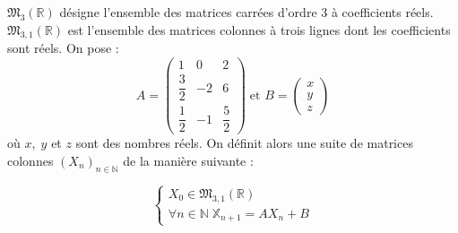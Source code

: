 \documentclass[a4paper, 11pt,reqno]{article}
\begin{document}
$\mathfrak{M}_{3}\left( \mathbb{R}\right) $ désigne l'ensemble des matrices
carrées d'ordre 3 à coefficients réels.\newline
$\mathfrak{M}_{3,1}\left( \mathbb{R}\right) $ est l'ensemble des matrices
colonnes à trois lignes dont les coefficients sont réels.\newline
On pose : 
\begin{equation*}
A=\left( 
\begin{array}{lll}
1 & 0 & 2 \\ 
\dfrac{3}{2} & -2 & 6 \\ 
\dfrac{1}{2} & -1 & \dfrac{5}{2}%
\end{array}%
\right) \;\text{et }B=\left( 
\begin{array}{c}
x \\ 
y \\ 
z%
\end{array}%
\right) 
\end{equation*}%
où $x,\;y$ et $z$ sont des nombres réels.\newline
On définit alors une suite de matrices colonnes $\left( X_{n}\right) _{n\in 
\mathbb{N}}$ de la manière suivante :

\begin{equation*}
\left\{ 
\begin{array}{l}
X_{0}\in \mathfrak{M}_{3,1}\left( \mathbb{R}\right) \\ 
\forall n\in \mathbb{N\;X}_{n+1}=AX_{n}+B%
\end{array}%
\right.
\end{equation*}
\end{document}
